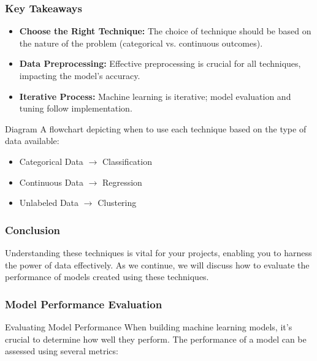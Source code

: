 \documentclass[aspectratio=169]{beamer}
\begin{document}
\begin{frame}[fragile]
    \frametitle{Key Takeaways}
    \begin{itemize}
        \item \textbf{Choose the Right Technique:} The choice of technique should be based on the nature of the problem (categorical vs. continuous outcomes).
        \item \textbf{Data Preprocessing:} Effective preprocessing is crucial for all techniques, impacting the model’s accuracy.
        \item \textbf{Iterative Process:} Machine learning is iterative; model evaluation and tuning follow implementation.
    \end{itemize}
    
    \begin{block}{Diagram}
        A flowchart depicting when to use each technique based on the type of data available:
        \begin{itemize}
            \item Categorical Data $\rightarrow$ Classification
            \item Continuous Data $\rightarrow$ Regression
            \item Unlabeled Data $\rightarrow$ Clustering
        \end{itemize}
    \end{block}
\end{frame}

\begin{frame}[fragile]
    \frametitle{Conclusion}
    Understanding these techniques is vital for your projects, enabling you to harness the power of data effectively. 
    As we continue, we will discuss how to evaluate the performance of models created using these techniques.
\end{frame}

\begin{frame}[fragile]
    \frametitle{Model Performance Evaluation}
    \begin{block}{Evaluating Model Performance}
        When building machine learning models, it's crucial to determine how well they perform. The performance of a model can be assessed using several metrics:
    \end{block}
\end{frame}
\end{document}
